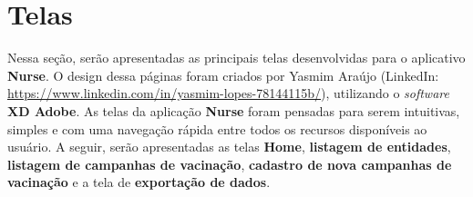 

\section{Telas}
\label{cap4:Sec:Telas}

Nessa seção, serão apresentadas as principais telas desenvolvidas para o aplicativo \textbf{Nurse}. O design dessa páginas foram criados por Yasmim Araújo (LinkedIn: \url{https://www.linkedin.com/in/yasmim-lopes-78144115b/}), utilizando o \textit{software} \textbf{XD Adobe}. As telas da aplicação \textbf{Nurse} foram pensadas para serem intuitivas, simples e com uma navegação rápida entre todos os recursos disponíveis ao usuário. A seguir, serão apresentadas as telas \textbf{Home}, \textbf{listagem de entidades}, \textbf{listagem de campanhas de vacinação}, \textbf{cadastro de nova campanhas de vacinação} e a tela de \textbf{exportação de dados}.


